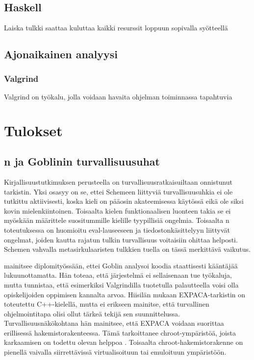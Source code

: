 \subsection{Haskell}

Laiska tulkki saattaa kuluttaa kaikki resurssit loppuun sopivalla syötteellä

\subsection{Ajonaikainen analyysi}

\subsubsection{Valgrind}

Valgrind on työkalu, jolla voidaan havaita ohjelman toiminnassa tapahtuvia 


\section{Tulokset}
\label{sec:tulos}

\subsection{\scmrobo n ja Goblinin turvallisuusuhat}

Kirjallisuustutkimuksen perusteella {\scmrobo} on turvallisuusratkaisuiltaan
onnistunut tarkistin. Yksi osasyy on se, ettei Schemeen liittyviä
turvallisuusuhkia ei ole tutkittu aktiivisesti, koska kieli on pääosin
akateemisessa käytössä eikä ole siksi kovin mielenkiintoinen. Toisaalta
kielen funktionaalisen luonteen takia se ei myöskään määrittele suositummille
kielille tyypillisiä ongelmia. Toisaalta \scmrobo n toteutuksessa on huomioitu
eval-lauseeseen ja tiedostonkäsittelyyn liittyvät ongelmat, joiden kautta
rajatun tulkin turvallisuus voitaisiin ohittaa helposti. Schemen vahvalla
metasirkulaaristen tulkkien tuella on tässä merkittävä vaikutus.

\citet{Hiisila2005} mainitsee diplomityössään, ettei Goblin analysoi koodia
staattisesti kääntäjää lukuunottamatta. Hän toteaa, että järjestelmä ei
sellaisenaan tue työkaluja, mutta tunnistaa, että esimerkiksi Valgrindilla
tuotetulla palautteella voisi olla opiskelijoiden oppimisen kannalta arvoa.
Hiisilän mukaan EXPACA-tarkistin on toteutettu C++-kielellä, mutta ei erikseen
mainitse, että turvallinen ohjelmointitapa olisi ollut tärkeä
tekijä sen suunnittelussa. Turvallisuusnäkökohtana hän mainitsee, että EXPACA
voidaan suorittaa erillisessä hakemistorakenteessa. Tämä tarkoittanee
chroot-ympäristöä, joista karkaamisen on todettu olevan helppoa \citep{Simes}.
Toisaalta chroot-hakemistorakenne on pienellä vaivalla siirrettävissä
virtualisoituun tai emuloituun ympäristöön. 

